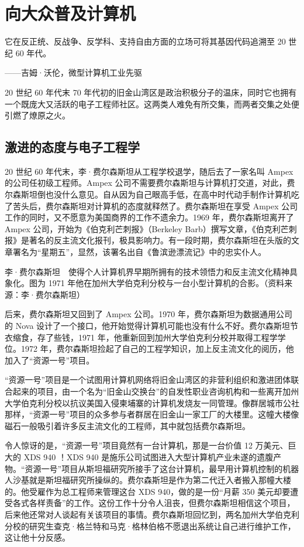 \documentclass[12pt,UTF8]{ctexbook}
\begin{document}
\section{向大众普及计算机}


它在反正统、反战争、反学科、支持自由方面的立场可将其基因代码追溯至 20 世纪 60 年代。

——吉姆·沃伦，微型计算机工业先驱



20 世纪 60 年代末 70 年代初的旧金山湾区是政治积极分子的温床，同时它也拥有一个既庞大又活跃的电子工程师社区。这两类人难免有所交集，而两者交集之处便引燃了燎原之火。





\subsection{激进的态度与电子工程学}


20 世纪 60 年代末，李·费尔森斯坦从工程学校退学，随后去了一家名叫 Ampex 的公司任初级工程师。Ampex 公司不需要费尔森斯坦与计算机打交道，对此，费尔森斯坦倒也没什么意见。自从因为自己眼高手低，在高中时代动手制作计算机吃了苦头后，费尔森斯坦对计算机的态度就释然了。费尔森斯坦在享受 Ampex 公司工作的同时，又不愿意为美国商界的工作不遗余力。1969 年，费尔森斯坦离开了 Ampex 公司，开始为《伯克利芒刺报》（Berkeley Barb）撰写文章，《伯克利芒刺报》是著名的反主流文化报刊，极具影响力。有一段时期，费尔森斯坦在头版的文章署名为“星期五”，显然，该署名出自《鲁滨逊漂流记》中的忠实仆人。



李·费尔森斯坦　使得个人计算机界早期所拥有的技术领悟力和反主流文化精神具象化。图为 1971 年他在加州大学伯克利分校与一台小型计算机的合影。（资料来源：李·费尔森斯坦）

后来，费尔森斯坦又回到了 Ampex 公司。1970 年，费尔森斯坦为数据通用公司的 Nova 设计了一个接口，他开始觉得计算机可能也没有什么不好。费尔森斯坦节衣缩食，存了些钱，1971 年，他重新回到加州大学伯克利分校并取得工程学学位。1972 年，费尔森斯坦捡起了自己的工程学知识，加上反主流文化的阅历，他加入了“资源一号”项目。

“资源一号”项目是一个试图用计算机网络将旧金山湾区的非营利组织和激进团体联合起来的项目，由一个名为“旧金山交换台”的自发性职业咨询机构和一些离开加州大学伯克利分校以抗议美国入侵柬埔寨的计算机发烧友一同管理。像群居城市公社那样，“资源一号”项目的众多参与者群居在旧金山一家工厂的大楼里。这幢大楼像磁石一般吸引着许多反主流文化的工程师，其中就包括费尔森斯坦。

令人惊讶的是，“资源一号”项目竟然有一台计算机，那是一台价值 12 万美元、巨大的 XDS 940 ！XDS 940 是施乐公司试图进入大型计算机产业未遂的遗腹产物。“资源一号”项目从斯坦福研究所接手了这台计算机，最早用计算机控制的机器人沙基就是斯坦福研究所操纵的。费尔森斯坦是作为第二代迁入者搬入那幢大楼的。他受雇作为总工程师来管理这台 XDS 940，做的是一份“月薪 350 美元却要遭受各式各样责备”的工作。这份工作十分令人沮丧，但费尔森斯坦相信这个项目，后来他还常对人谈起有关该项目的事情。费尔森斯坦回忆到，两名加州大学伯克利分校的研究生查克·格兰特和马克·格林伯格不愿退出系统让自己进行维护工作，这让他十分反感。
\end{document}
